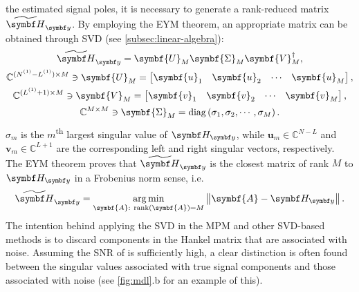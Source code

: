 the estimated signal poles, it is necessary to
generate a rank-reduced matrix $\Hytilde$. By employing the \ac{EYM}
theorem\cite[Section~2.2]{Golub2013}, an appropriate matrix can be obtained
through \ac{SVD} (see \cref{subsec:linear-algebra}):%
\begin{subequations}%
    \begin{gather}%
    \Hytilde =
        \symbf{U}_M^{\vphantom{\dagger}}
        \symbf{\Sigma}_M^{\vphantom{\dagger}}
        \symbf{V}_M^{\dagger},\\
    \mathbb{C}^{(\None - \Lone) \times M} \ni
        \symbf{U}_M^{\vphantom{\dagger}} =
        \begin{bmatrix}
            \symbf{u}_1 &
            \symbf{u}_2 &
            \cdots &
            \symbf{u}_M
        \end{bmatrix},\\
    \mathbb{C}^{(\Lone + 1) \times M} \ni
        \symbf{V}_M^{\vphantom{\dagger}} =
        \begin{bmatrix}
            \symbf{v}_1 &
            \symbf{v}_2 &
            \cdots &
            \symbf{v}_M
        \end{bmatrix},\\
    \mathbb{C}^{M \times M} \ni
        \symbf{\Sigma}_M^{\vphantom{\dagger}} =
        \diag \left( \sigma_1, \sigma_2, \cdots, \sigma_M \right).
    \end{gather}
\end{subequations}
$\sigma_m$ is the $m$\textsuperscript{th} largest singular value of $\Hy$,
while $\symbf{u}_m \in \mathbb{C}^{N - L}$ and $\symbf{v}_m \in
\mathbb{C}^{L+1}$ are the corresponding left and right singular vectors,
respectively. The \ac{EYM} theorem proves that $\Hytilde$ is the closest matrix
of rank $M$ to $\Hy$ in a Frobenius norm sense, i.e.
\begin{equation}
    \Hytilde = \argmin_{\symbf{A}:\ \rank(\symbf{A}) = M} \left \lVert \symbf{A} - \Hy \right \rVert.
\end{equation}
The intention behind applying the \ac{SVD} in the \ac{MPM} and other
\ac{SVD}-based methods is to discard components in the Hankel matrix that are
associated with noise. Assuming the \ac{SNR} of  is sufficiently high,
a clear distinction is often found between the singular values associated with
true signal components and those associated with noise (see \cref{fig:mdl}.b
for an example of this).

